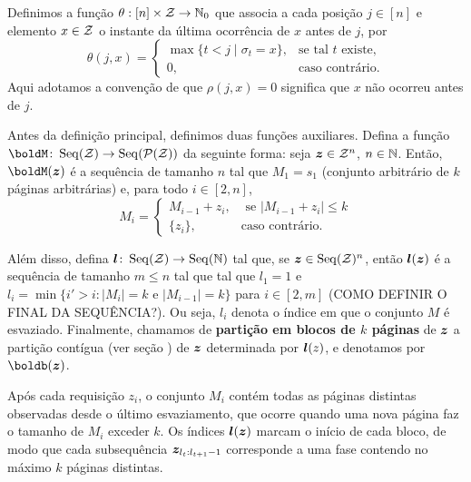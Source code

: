 \begin{definition}
Definimos a função \(\theta : [n] \times \mathcal{Z} \to \mathbb{N}_0\) que associa a cada posição \(j \in [n]\) e elemento \(x \in \mathcal{Z}\) o instante da última ocorrência de \(x\) antes de \(j\), por
\begin{equation}
\theta(j, x) =
\begin{cases}
  \max\{ t < j \mid \sigma_t = x \}, & \text{se tal } t \text{ existe}, \\[6pt]
  0, & \text{caso contrário}.
\end{cases}
\end{equation}
Aqui adotamos a convenção de que \(\rho(j,x)=0\) significa que \(x\) não ocorreu antes de \(j\).
\end{definition}

\begin{definition}
  \label{def:fases}
  Antes da definição principal, definimos duas funções auxiliares. Defina a função \(\boldM \colon \Seq(\Zcal) \to \Seq(\Pcal(\Zcal))\)  da seguinte forma: seja \(\bm{z} \in \mathcal{Z}^n\), \(n \in \mathbb{N}\). Então, \(\boldM(\boldz)\) é a sequência de tamanho \(n\) tal que \(M_1 = s_1\) (conjunto arbitrário de \(k\) páginas arbitrárias) e, para todo \(i \in [2,n]\), 
  \begin{equation*}
    M_i =
  \begin{cases}
    M_{i-1} + z_i, & \text{ se } |M_{i-1} + z_i| \le k  \\
  \{z_i\}, & \text{caso contrário}.
\end{cases}
\end{equation*}

Além disso, defina \(\bm{l} \colon \operatorname{Seq}(\mathcal{Z}) \to \operatorname{Seq}(\mathbb{N})\) tal que, se \(\bm{z} \in \operatorname{Seq}(\mathcal{Z})^n\), então \(\bm{l}(\bm{z})\) é a sequência de tamanho \(m \le n\) tal que tal que \(l_1 =1\) e \(l_i = \min\{i' > i \colon |M_i| = k \text{ e } |M_{i-1}| = k\}\) para \(i \in [2,m]\) (COMO DEFINIR O FINAL DA SEQUÊNCIA?). Ou seja, \(l_i\) denota o índice em que o conjunto \(M\) é esvaziado. Finalmente, chamamos de \textbf{partição em blocos de \(k\) páginas} de \(\bm{z}\) a partição contígua (ver seção ) de \(\bm{z}\) determinada por \(\bm{l}(z)\), e denotamos por \(\boldb(\boldz)\).
\end{definition}

Após cada requisição \(z_i\), o conjunto \(M_i\) contém todas as páginas distintas observadas desde o último esvaziamento, que ocorre quando uma nova página faz o tamanho de \(M_i\) exceder \(k\). Os índices \(\bm{l}(\bm{z})\) marcam o início de cada bloco, de modo que cada subsequência \(\bm{z}_{l_t : l_{t+1}-1}\) corresponde a uma fase contendo no máximo \(k\) páginas distintas.

